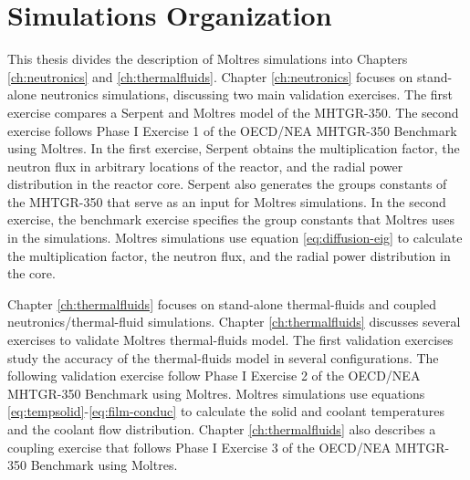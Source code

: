 \section{Simulations Organization}

This thesis divides the description of Moltres simulations into Chapters \ref{ch:neutronics} and \ref{ch:thermalfluids}.
Chapter \ref{ch:neutronics} focuses on stand-alone neutronics simulations, discussing two main validation exercises.
The first exercise compares a Serpent and Moltres model of the MHTGR-350.
The second exercise follows Phase I Exercise 1 of the OECD/NEA MHTGR-350 Benchmark using Moltres.
In the first exercise, Serpent obtains the multiplication factor, the neutron flux in arbitrary locations of the reactor, and the radial power distribution in the reactor core.
Serpent also generates the groups constants of the MHTGR-350 that serve as an input for Moltres simulations.
In the second exercise, the benchmark exercise specifies the group constants that Moltres uses in the simulations.
Moltres simulations use equation \ref{eq:diffusion-eig} to calculate the multiplication factor, the neutron flux, and the radial power distribution in the core.

Chapter \ref{ch:thermalfluids} focuses on stand-alone thermal-fluids and coupled neutronics/thermal-fluid simulations.
Chapter \ref{ch:thermalfluids} discusses several exercises to validate Moltres thermal-fluids model.
The first validation exercises study the accuracy of the thermal-fluids model in several configurations.
The following validation exercise follow Phase I Exercise 2 of the OECD/NEA MHTGR-350 Benchmark using Moltres.
Moltres simulations use equations \ref{eq:tempsolid}-\ref{eq:film-conduc} to calculate the solid and coolant temperatures and the coolant flow distribution.
Chapter \ref{ch:thermalfluids} also describes a coupling exercise that follows Phase I Exercise 3 of the OECD/NEA MHTGR-350 Benchmark using Moltres.
